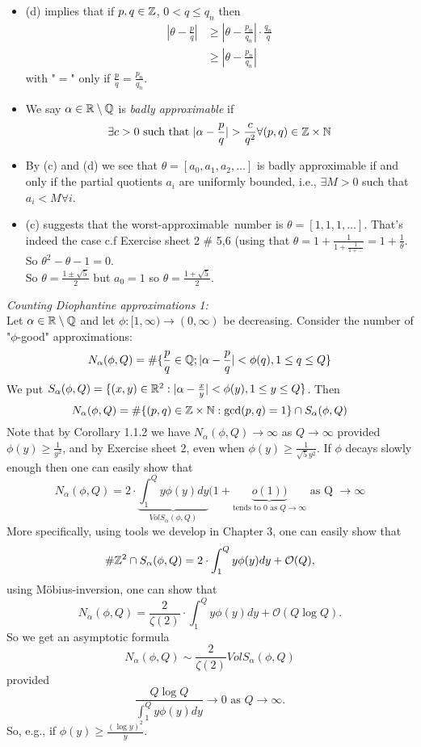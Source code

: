\documentclass[NumTh.tex]{subfiles}
\begin{document}
\begin{rem}
  \begin{itemize}
    \item (d) implies that if $p,q \in \mathbb{Z}$, $0 < q \leq q_n$ then
    \begin{align*}
      |\theta - \frac{p}{q}| &\geq |\theta - \frac{p_n}{q_n}| \cdot \frac{q_n}{q}\\
      &\geq | \theta - \frac{p_n}{q_n}|
    \end{align*}
    with "$=$" only if $\frac{p}{q} = \frac{p_n}{q_n}$.
    \item We say $\alpha \in \mathbb{R} \setminus \mathbb{Q}$ is \emph{badly approximable} if
    \[ \exists c > 0 \text{ such that } |\alpha - \frac{p}{q}| > \frac{c}{q^2} \forall (p,q) \in \mathbb{Z} \times \mathbb{N}\]
    \item By (c) and (d) we see that $\theta = [a_0,a_1,a_2,\dots]$ is badly approximable if and only if
    the partial quotients $a_i$ are uniformly bounded, i.e., $\exists M > 0$ such that $a_i < M \forall i$.
    \item (c) suggests that the \grqq worst-approximable\grqq ~number is $\theta = [1,1,1,\dots]$. 
    That's indeed the case c.f Exercise sheet 2 \# 5,6 (using that $\theta = 1 + \frac{1}{1+\frac{1}{1+\dots}} = 1 + \frac{1}{\theta}$.
    So $\theta^2 - \theta -1 = 0$.\\
    So $\theta = \frac{1 \pm \sqrt{5}}{2}$ but $a_0 = 1$ so $\theta = \frac{1 + \sqrt{5}}{2}$.
  \end{itemize}
\end{rem}

\emph{Counting Diophantine approximations 1:}\\
Let $\alpha \in \mathbb{R} \setminus \mathbb{Q}$ and let $\phi: [1,\infty) \to (0,\infty)$ be decreasing.
Consider the number of "$\phi$-good" approximations:
\[ N_\alpha(\phi,Q) = \#\{\frac{p}{q} \in \mathbb{Q} ; |\alpha - \frac{p}{q} | < \phi(q), 1 \leq q \leq Q\} \]
We put $S_\alpha(\phi,Q) = \{(x,y)\in \mathbb{R}^2 : | \alpha - \frac{x}{y}| < \phi(y), 1 \leq y \leq Q\}$.
Then
\[ N_\alpha(\phi,Q) = \#\{(p,q)\in \mathbb{Z} \times \mathbb{N} : \gcd(p,q) = 1\} \cap S_\alpha(\phi,Q) \]
Note that by Corollary 1.1.2 we have $N_\alpha(\phi,Q) \to \infty$ as $Q \to \infty$ provided $\phi(y) \geq \frac{1}{y^2}$,
and by Exercise sheet 2, even when $\phi(y) \geq \frac{1}{\sqrt{5}y^2}$.
If $\phi$ decays slowly enough then one can easily show that
\[ N_\alpha(\phi,Q) = 2 \cdot \underbrace{\int_1^Q y \phi(y) dy}_{Vol S_\alpha (\phi,Q)}(1+ \underbrace{o(1))}_{\text{tends to } 0 \text{ as } Q \to \infty} \text{ as Q } \to \infty \]
More specifically, using tools we develop in Chapter 3, one can easily show that
\[ \#\mathbb{Z}^2 \cap S_\alpha(\phi,Q) = 2 \cdot \int_1^Q y \phi(y) dy + \mathcal{O}(Q), \]
using Möbius-inversion, one can show that 
\[ N_\alpha(\phi,Q) = \frac{2}{\zeta(2)} \cdot \int_1^Q y \phi(y) dy + \mathcal{O}(Q \log{Q}).\]
So we get an asymptotic formula
\[ N_\alpha (\phi,Q) \sim \frac{2}{\zeta(2)} Vol S_\alpha (\phi,Q) \]
provided
\[ \frac{Q \log Q}{\int_1^Q y \phi(y)dy} \to 0 \text{ as } Q \to \infty. \]
So, e.g., if $\phi(y) \geq \frac{(\log y)^2}{y}$.
\end{document}
